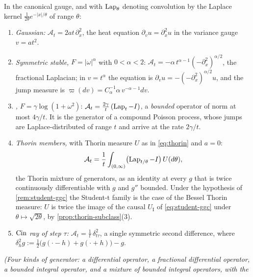 \begin{proposition}\label{prop:corner-generators}
\leanok
In the canonical gauge, and with $\operatorname{Lap}_\theta$ denoting convolution by the Laplace kernel
$\tfrac{1}{2\theta}e^{-|x|/\theta}$ of range $\theta$:
\begin{enumerate}
\item \emph{Gaussian:} $\mathcal{A}_t = 2at\,\partial_x^2$, the heat equation
$\partial_v u = \partial_x^2u$ in the variance gauge $v = at^2$.
\item \emph{Symmetric stable,} $F = |\omega|^\alpha$ with $0 < \alpha < 2$:
$\mathcal{A}_t = -\alpha\,t^{\alpha-1}(-\partial_x^2)^{\alpha/2}$, the fractional Laplacian;
in $v = t^\alpha$ the equation is $\partial_v u = -(-\partial_x^2)^{\alpha/2}u$, and the jump
measure is $\varpi(dv) = C_\alpha^{-1}\alpha\,v^{-\alpha-1}dv$.
\item \emph{\Matern{},} $F = \gamma\log(1+\omega^2)$:
$\mathcal{A}_t = \tfrac{2\gamma}{t}\,(\operatorname{Lap}_t - I)$, a \emph{bounded} operator of norm at most
$4\gamma/t$. It is the generator of a compound Poisson process, whose jumps are
Laplace-distributed of range $t$ and arrive at the rate $2\gamma/t$.
\item \emph{Thorin members,} with Thorin measure $U$ as in \ref{eq:thorin} and $a = 0$:
\[
  \mathcal{A}_t = \frac1t\int_{(0,\infty)}\bigl(\operatorname{Lap}_{t/\theta} - I\bigr)\,U(d\theta),
\]
the Thorin mixture of \Matern{} generators, as an identity at every $g$ that is twice continuously
differentiable with $g$ and $g''$ bounded. Under the hypothesis of \ref{rem:student-ggc} the
Student-t family is the case of the Bessel Thorin measure: $U$ is twice the image of the causal
$U_{\mathrm I}$ of \ref{eq:student-ggc} under $\theta \mapsto \sqrt{2\theta}$, by
\ref{prop:thorin-subclass}(3).
\item \emph{$\operatorname{Cin}$ ray of step $\tau$:} $\mathcal{A}_t = \tfrac1t\,\delta^2_{t\tau}$, a single
symmetric second difference, where
$\delta^2_h g := \tfrac12\bigl(g(\cdot - h) + g(\cdot + h)\bigr) - g$.
\end{enumerate}
\statusT\quad\emph{(Four kinds of generator: a differential operator, a fractional differential
operator, a bounded integral operator, and a mixture of bounded integral operators, with the
}
\end{proposition}
